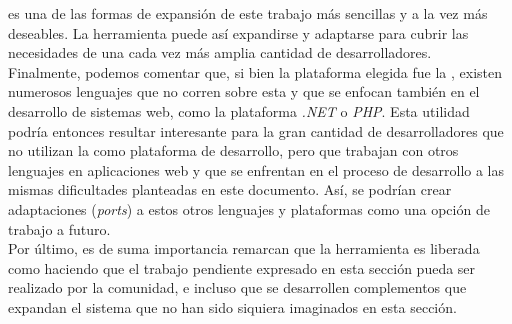 \frameworks es una de las formas de expansión de este trabajo más sencillas y
a la vez más deseables. La herramienta puede así expandirse y adaptarse para
cubrir las necesidades de una cada vez más amplia cantidad de desarrolladores.\\
Finalmente, podemos comentar que, si bien la plataforma elegida fue la \jvm,
existen numerosos lenguajes que no corren sobre esta y que se enfocan también
en el desarrollo de sistemas web, como la plataforma \emph{.NET} o \emph{PHP}.
Esta utilidad podría entonces resultar interesante para la gran cantidad de
desarrolladores que no utilizan la \jvm como plataforma de desarrollo, pero
que trabajan con otros lenguajes en aplicaciones web y que se enfrentan en
el proceso de desarrollo a las mismas dificultades planteadas en este documento.
Así, se podrían crear adaptaciones (\emph{ports}) a estos otros lenguajes y
plataformas como una opción de trabajo a futuro.\\
Por último, es de suma importancia remarcan que la herramienta es liberada como
\freesoft haciendo que el trabajo pendiente expresado en esta sección pueda ser
realizado por la comunidad, e incluso que se desarrollen complementos que
expandan el sistema que no han sido siquiera imaginados en esta sección.\\